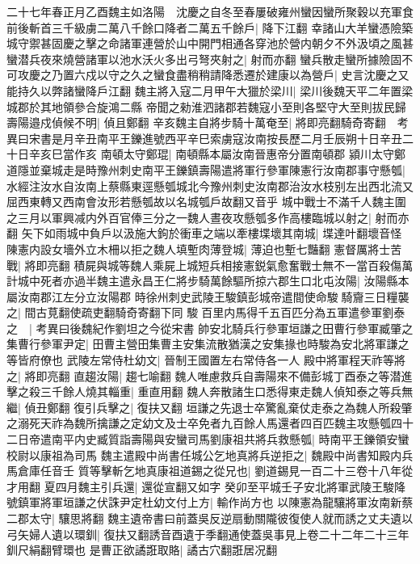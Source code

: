 二十七年春正月乙酉魏主如洛陽　沈慶之自冬至春屢破雍州蠻因蠻所聚穀以充軍食前後斬首三千級虜二萬八千餘口降者二萬五千餘戶|{
	降下江翻}
幸諸山大羊蠻憑險築城守禦甚固慶之擊之命諸軍連營於山中開門相通各穿池於營内朝夕不外汲頃之風甚蠻潜兵夜來燒營諸軍以池水沃火多出弓弩夾射之|{
	射而亦翻}
蠻兵散走蠻所據險固不可攻慶之乃置六戍以守之久之蠻食盡稍稍請降悉遷於建康以為營戶|{
	史言沈慶之又能持久以弊諸蠻降戶江翻}
魏主將入寇二月甲午大獵於梁川|{
	梁川後魏天平二年置梁城郡於其地領參合旋鴻二縣}
帝聞之勑淮泗諸郡若魏寇小至則各堅守大至則拔民歸壽陽邉戍偵候不明|{
	偵且鄭翻}
辛亥魏主自將步騎十萬奄至|{
	將即亮翻騎奇寄翻　考異曰宋書是月辛丑南平王鑠進號西平辛巳索虜寇汝南按長歷二月壬辰朔十日辛丑二十日辛亥巳當作亥}
南頓太守鄭琨|{
	南頓縣本屬汝南晉惠帝分置南頓郡}
潁川太守鄭道隱並棄城走是時豫州刺史南平王鑠鎮壽陽遣將軍行參軍陳憲行汝南郡事守懸瓠|{
	水經注汝水自汝南上蔡縣東逕懸瓠城北今豫州刺史汝南郡治汝水枝别左出西北流又屈西東轉又西南會汝形若懸瓠故以名城瓠戶故翻又音乎}
城中戰士不滿千人魏主圍之三月以軍興减内外百官俸三分之一魏人晝夜攻懸瓠多作高樓臨城以射之|{
	射而亦翻}
矢下如雨城中負戶以汲施大鉤於衝車之端以牽樓堞壞其南城|{
	堞達叶翻壞音怪}
陳憲内設女墻外立木柵以拒之魏人填塹肉薄登城|{
	薄迫也塹七豔翻}
憲督厲將士苦戰|{
	將即亮翻}
積屍與城等魏人乘屍上城短兵相接憲鋭氣愈奮戰士無不一當百殺傷萬計城中死者亦過半魏主遣永昌王仁將步騎萬餘驅所掠六郡生口北屯汝陽|{
	汝陽縣本屬汝南郡江左分立汝陽郡}
時徐州刺史武陵王駿鎮彭城帝遣間使命駿騎齎三日糧襲之|{
	間古莧翻使疏吏翻騎奇寄翻下同}
駿百里内馬得千五百匹分為五軍遣參軍劉泰之　|{
	考異曰後魏紀作劉坦之今從宋書}
帥安北騎兵行參軍垣謙之田曹行參軍臧肇之集曹行參軍尹定|{
	田曹主營田集曹主安集流散猶漢之安集掾也時駿為安北將軍謙之等皆府僚也}
武陵左常侍杜幼文|{
	晉制王國置左右常侍各一人}
殿中將軍程天祚等將之|{
	將即亮翻}
直趨汝陽|{
	趨七喻翻}
魏人唯慮救兵自壽陽來不備彭城丁酉泰之等潜進擊之殺三千餘人燒其輜重|{
	重直用翻}
魏人奔散諸生口悉得東走魏人偵知泰之等兵無繼|{
	偵丑鄭翻}
復引兵擊之|{
	復扶又翻}
垣謙之先退士卒驚亂棄仗走泰之為魏人所殺肇之溺死天祚為魏所擒謙之定幼文及士卒免者九百餘人馬還者四百匹魏主攻懸瓠四十二日帝遣南平内史臧質詣壽陽與安蠻司馬劉康祖共將兵救懸瓠|{
	時南平王鑠領安蠻校尉以康祖為司馬}
魏主遣殿中尚書任城公乞地真將兵逆拒之|{
	魏殿中尚書知殿内兵馬倉庫任音壬}
質等擊斬乞地真康祖道錫之從兄也|{
	劉道錫見一百二十三卷十八年從才用翻}
夏四月魏主引兵還|{
	還從宣翻又如字}
癸卯至平城壬子安北將軍武陵王駿降號鎮軍將軍垣謙之伏誅尹定杜幼文付上方|{
	輸作尚方也}
以陳憲為龍驤將軍汝南新蔡二郡太守|{
	驤思將翻}
魏主遺帝書曰前蓋吳反逆扇動關隴彼復使人就而誘之丈夫遺以弓矢婦人遺以環釧|{
	復扶又翻誘音酉遺于季翻通使蓋吳事見上卷二十二年二十三年釧尺絹翻臂環也}
是曹正欲譎誑取賂|{
	譎古穴翻誑居况翻}
